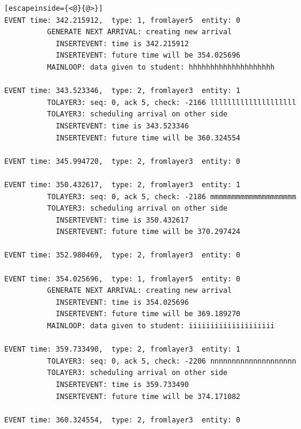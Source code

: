 \documentclass[paper=a4, fontsize=11pt]{scrartcl}
\numberwithin{equation}{section}		%
\numberwithin{figure}{section}			%
\numberwithin{table}{section}				%
\begin{document}
\begin{lstlisting}[escapeinside={<@}{@>}]
EVENT time: 342.215912,  type: 1, fromlayer5  entity: 0
          GENERATE NEXT ARRIVAL: creating new arrival
            INSERTEVENT: time is 342.215912
            INSERTEVENT: future time will be 354.025696
          MAINLOOP: data given to student: hhhhhhhhhhhhhhhhhhhh

EVENT time: 343.523346,  type: 2, fromlayer3  entity: 1
          TOLAYER3: seq: 0, ack 5, check: -2166 llllllllllllllllllll
          TOLAYER3: scheduling arrival on other side
            INSERTEVENT: time is 343.523346
            INSERTEVENT: future time will be 360.324554

EVENT time: 345.994720,  type: 2, fromlayer3  entity: 0

EVENT time: 350.432617,  type: 2, fromlayer3  entity: 1
          TOLAYER3: seq: 0, ack 5, check: -2186 mmmmmmmmmmmmmmmmmmmm
          TOLAYER3: scheduling arrival on other side
            INSERTEVENT: time is 350.432617
            INSERTEVENT: future time will be 370.297424

EVENT time: 352.980469,  type: 2, fromlayer3  entity: 0

EVENT time: 354.025696,  type: 1, fromlayer5  entity: 0
          GENERATE NEXT ARRIVAL: creating new arrival
            INSERTEVENT: time is 354.025696
            INSERTEVENT: future time will be 369.189270
          MAINLOOP: data given to student: iiiiiiiiiiiiiiiiiiii

EVENT time: 359.733490,  type: 2, fromlayer3  entity: 1
          TOLAYER3: seq: 0, ack 5, check: -2206 nnnnnnnnnnnnnnnnnnnn
          TOLAYER3: scheduling arrival on other side
            INSERTEVENT: time is 359.733490
            INSERTEVENT: future time will be 374.171082

EVENT time: 360.324554,  type: 2, fromlayer3  entity: 0


\end{lstlisting}
\end{document}
